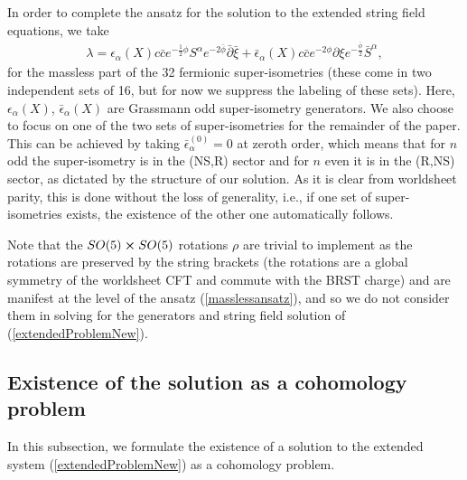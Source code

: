 \documentclass[12pt]{article}
\numberwithin{equation}{section}
\begin{document}
In order to complete the ansatz for the solution to the extended string field equations, we take
\begin{align}
    \lambda = \epsilon_{\alpha}(X) c\bar{c}e^{-\frac{1}{2}\phi} S^\alpha e^{-2\bar{\phi}}\bar{\partial}\bar{\xi} + \bar{\epsilon}_{\alpha}(X) c\bar{c} e^{-2\phi}\partial \xi e^{-\frac{\bar{\phi}}{2}}\bar{S}^\alpha,
    \label{phiAnsatz}
\end{align}
for the massless part of the 32 fermionic super-isometries (these come in two independent sets of 16, but for now we suppress the labeling of these sets). Here, $\epsilon_{\alpha}(X)$, $\bar{\epsilon}_{\alpha}(X)$ are Grassmann odd super-isometry generators.  We also choose to focus on one of the two sets of super-isometries for the remainder of the paper. This can be achieved by taking $\bar{\epsilon}^{(0)}_\alpha = 0$ at zeroth order, which means that for $n$ odd the super-isometry is in the (NS,R) sector and for $n$ even it is in the (R,NS) sector, as dictated by the structure of our solution. As it is clear from worldsheet parity, this is done without the loss of generality, i.e., if one set of super-isometries exists, the existence of the other one automatically follows.


Note that the $SO(5) \cross SO(5)$ rotations $\rho$ are trivial to implement as the rotations are preserved by the string brackets (the rotations are a global symmetry of the worldsheet CFT and commute with the BRST charge) and are manifest at the level of the ansatz (\ref{masslessansatz}), and so we do not consider them in solving for the generators and string field solution of (\ref{extendedProblemNew}).


\subsection{Existence of the solution as a cohomology problem}
In this subsection, we formulate the existence of a solution to the extended system (\ref{extendedProblemNew}) as a cohomology problem.
\end{document}
